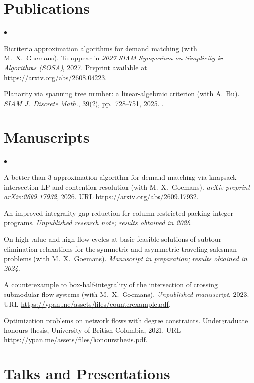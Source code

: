 \documentclass[margin,line]{res}
\newenvironment{list2}{
  \begin{list}{$\bullet$}{%
      \setlength{\itemsep}{0in}
      \setlength{\parsep}{0in} \setlength{\parskip}{0in}
      \setlength{\topsep}{0in} \setlength{\partopsep}{0in}
      \setlength{\leftmargin}{0.2in}}}{\end{list}}
\begin{document}
\begin{resume}
\section{\sc Publications}
\begin{list2}
  \item[$\circ$] Bicriteria approximation algorithms for demand matching (with M.\ X.\ Goemans). To appear in \emph{2027 SIAM Symposium on Simplicity in Algorithms (SOSA)}, 2027. Preprint available at \url{https://arxiv.org/abs/2608.04223}.
  \item[$\circ$] Planarity via spanning tree number: a linear-algebraic criterion (with A.\ Bu). \emph{SIAM J.\ Discrete Math.}, 39(2), pp.\ 728--751, 2025. .
\end{list2}


\section{\sc Manuscripts}

\begin{list2}
  \item[$\circ$] A better-than-$3$ approximation algorithm for demand matching via knapsack intersection LP and contention resolution (with M.\ X.\ Goemans). \emph{arXiv preprint arXiv:2609.17932}, 2026. URL \href{https://arxiv.org/abs/2609.17932}{https://arxiv.org/abs/2609.17932}.
  \item[$\circ$] An improved integrality-gap reduction for column-restricted packing integer programs. \emph{Unpublished research note; results obtained in 2026.}
  \item[$\circ$] On high-value and high-flow cycles at basic feasible solutions of subtour elimination relaxations for the symmetric and asymmetric traveling salesman problems (with M.\ X.\ Goemans). \emph{Manuscript in preparation; results obtained in 2024.}
  \item[$\circ$] A counterexample to box-half-integrality of the intersection of crossing submodular flow systems (with M.\ X.\ Goemans). \emph{Unpublished manuscript}, 2023. URL \url{https://ypan.me/assets/files/counterexample.pdf}.
  \item[$\circ$] Optimization problems on network flows with degree constraints. Undergraduate honours thesis, University of British Columbia, 2021. URL \url{https://ypan.me/assets/files/honoursthesis.pdf}.
\end{list2}


\section{\sc Talks and Presentations}


\end{resume}
\end{document}
